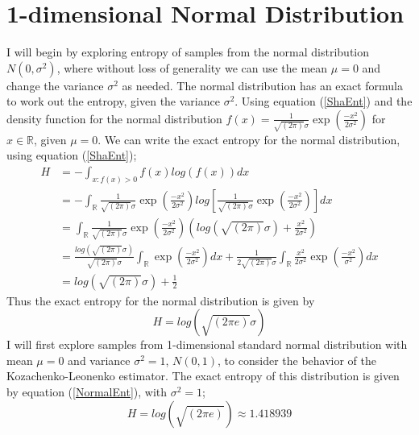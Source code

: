 \documentclass{report}
\begin{document}
\section{1-dimensional Normal Distribution} \label{Normal_d=1}

I will begin by exploring entropy of samples from the normal distribution $N(0, \sigma^2)$, where without loss of generality we can use the mean $\mu = 0$ and change the variance $\sigma^2$ as needed. The normal distribution has an exact formula to work out the entropy, given the variance $\sigma^2$. Using equation (\ref{ShaEnt}) and the density function for the normal distribution $f(x) = \frac{1}{\sqrt{(2\pi)} \sigma}\exp{ \left( \frac{-x^2}{2\sigma^2} \right)}$ for $x \in \mathbb{R}$, given $\mu = 0$. We can write the exact entropy for the normal distribution, using equation (\ref{ShaEnt});
\begin{align}
H &= - \int_{x : f(x) > 0} f(x) log(f(x)) dx \nonumber \\
&= - \int_{\mathbb{R}} \frac{1}{\sqrt{(2\pi)} \sigma}\exp{ \left( \frac{-x^2}{2\sigma^2} \right)} log \left[\frac{1}{\sqrt{(2\pi)} \sigma}\exp{ \left( \frac{-x^2}{2\sigma^2} \right)} \right] dx \nonumber \\
&=  \int_{\mathbb{R}} \frac{1}{\sqrt{(2\pi)} \sigma}\exp{ \left( \frac{-x^2}{2\sigma^2} \right)} \left( log(\sqrt{(2\pi)}\sigma) +  \frac{x^2}{2\sigma^2} \right) \nonumber \\
&= \frac{log(\sqrt{(2\pi)}\sigma)}{\sqrt{(2\pi)} \sigma} \int_{\mathbb{R}} \exp{ \left( \frac{-x^2}{2\sigma^2} \right)} dx +  \frac{1}{2\sqrt{(2\pi)} \sigma} \int_{\mathbb{R}} \frac{x^2}{2\sigma^2}  \exp{ \left( \frac{-x^2}{\sigma^2} \right)} dx \nonumber \\
&=  log(\sqrt{(2\pi)}\sigma) + \frac{1}{2} \nonumber 
\end{align}
Thus the exact entropy for the normal distribution is given by 
\begin{equation}\label{NormalEnt}
H =  log(\sqrt{(2\pi e)}\sigma) 
\end{equation}
I will first explore samples from 1-dimensional standard normal distribution with mean $\mu = 0$ and variance $\sigma^2 = 1$, $N(0, 1)$, to consider the behavior of the Kozachenko-Leonenko estimator. The exact entropy of this distribution is given by equation (\ref{NormalEnt}), with $\sigma^2=1$;
\begin{equation} \label{normal_exact}
H = log(\sqrt{(2\pi e)}) \approx 1.418939
\end{equation}
\end{document}
